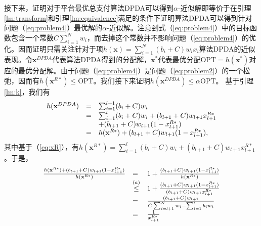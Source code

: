 	接下来，证明对于平台最优总支付算法DPDA可以得到$\alpha$-近似解即等价于在引理\ref{lm:transform}和引理\ref{lm:equivalence}满足的条件下证明算法DPDA可以得到针对问题（\ref{eq:problem4}）最优解的$\alpha$-近似解。注意到式（\ref{eq:problem4}）中的目标函数包含一个常数$C\sum_{i=1}^{N}w_i$，而去掉这个常数并不影响问题（\ref{eq:problem4}）的优化。因而证明只需关注针对于项$h(\mathbf{x})=\sum_{i=1}^{N}(b_i+C)w_ix_i$算法DPDA的近似表现。令$\mathbf{x}^{DPDA}$代表算法DPDA得到的分配解，$\mathbf{x}^*$代表最优分配$\text{OPT}=h(\mathbf{x}^*)$对应的最优分配解。由于问题（\ref{eq:problem4}）是问题（\ref{eq:problem2}）的一个松弛，因而有$h(\mathbf{x}^{R*})\le \text{OPT}$。我们接下来证明$h(\mathbf{x}^{DPDA})\le\alpha\text{OPT}$。
	基于引理\ref{lm:k}，我们有	
	\begin{equation}%
	\hspace{-0.0cm}
	\begin{array}
	[c]{lll}%
	h(\mathbf{x}^{DPDA})&=&\sum_{i=1}^{l+1}(b_i+C)w_i\\
	&=&\sum_{i=1}^{l}(b_i+C)w_i+(b_{l+1}+C)w_{l+1}x_{l+1}^{R*}\\
	&&+(b_{l+1}+C)w_{l+1}(1-x_{l+1}^{R*})\\
	&=&h(\mathbf{x}^{R*})+(b_{l+1}+C)w_{l+1}(1-x_{l+1}^{R*}),
	\end{array}
	\label{eq:h}
	\end{equation}
	其中基于（\ref{eq:xR}），有$h(\mathbf{x}^{R*})=\sum_{i=1}^{l}(b_i+C)w_i+(b_{l+1}+C)w_{l+1}x_{l+1}^{R*}$。于是，
	\begin{equation}%
	\hspace{-0.0cm}
	\begin{array}
	[c]{lll}%
	\frac{h(\mathbf{x}^{R*})+(b_{l+1}+C)w_{l+1}(1-x_{l+1}^{R*})}{h(\mathbf{x}^{R*})}
	&=& 1+ \frac{(b_{l+1}+C)w_{l+1}(1-x_{l+1}^{R*})}{h(\mathbf{x}^{R*})}\\
	&\mathop{\le}\limits^{(a)}&  1+ \frac{(b_{l+1}+C)w_{l+1}(1-x_{l+1}^{R*})}{(b_{l+1}+C)w_{l+1}x_{l+1}^{R*}}\\
	&=&\frac{(b_{l+1}+C)w_{l+1}}{C\sum_{i=l+1}^N w_i-\sum_{i=1}^{l} b_iw_i}\\
	&=&\frac{1}{x_{l+1}^{R*}}
	\end{array}
	\label{eq:h}
	\end{equation}

